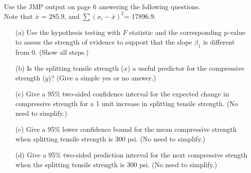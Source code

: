 \documentclass[11pt]{article}
\begin{document}
{\noindent Use the JMP output on page 6 answering the
following questions. \\ Note that $\bar x$ = 285.9, and
$\sum(x_i-\bar x)^2$= 17896.9.





\begin{enumerate}

\item[(a)] Use the hypothesis testing with $F$ statistic and the corresponding p-value to assess the strength of evidence to support that
the slope $\beta_1$ is different from 0. (Show all steps.)

\vskip 12cm

\item[(b)] Is the splitting tensile strength ($x$) a useful predictor for the compressive strength ($y$)? (Give a simple yes or no answer.)

\hfill {}

\clearpage
\item[(c)] Give a 95\% two-sided confidence interval for the expected change in compressive strength for a 1 unit
increase in splitting tensile strength. (No need to simplify.)

\hfill {}

 \vskip 6cm

\item[(c)] Give a 95\% lower confidence bound for the mean compressive strength when splitting tensile strength is 300 psi. (No need
to simplify.)

\hfill {}

\vskip 6cm

\item[(d)] Give a 95\% two-sided prediction interval for the next compressive stength when the splitting tensile strength is 300 psi. (No
    need to simplify.)

\hfill {}


\end{enumerate}}
\end{document}
